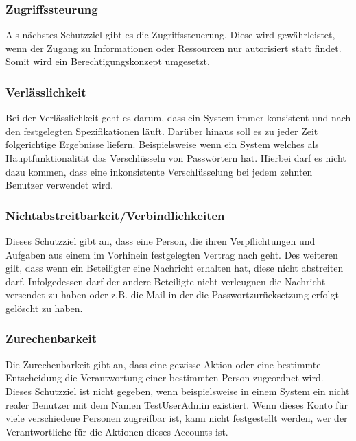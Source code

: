 \subsubsection{Zugriffssteurung}
Als nächstes Schutzziel gibt es die Zugriffssteuerung. Diese wird gewährleistet, wenn der Zugang zu Informationen oder Ressourcen nur autorisiert statt findet. Somit wird ein Berechtigungskonzept umgesetzt. 


\subsubsection{Verlässlichkeit}
Bei der Verlässlichkeit geht es darum, dass ein System immer konsistent und nach den festgelegten Spezifikationen läuft. Darüber hinaus soll es zu jeder Zeit folgerichtige Ergebnisse liefern. Beispielsweise wenn ein System welches als Hauptfunktionalität das Verschlüsseln von Passwörtern hat. Hierbei darf es nicht dazu kommen, dass eine inkonsistente Verschlüsselung bei jedem zehnten Benutzer verwendet wird.

\subsubsection{Nichtabstreitbarkeit/Verbindlichkeiten}
Dieses Schutzziel gibt an, dass eine Person, die ihren Verpflichtungen und Aufgaben aus einem im Vorhinein festgelegten Vertrag nach geht. Des weiteren gilt, dass wenn ein Beteiligter eine Nachricht erhalten hat, diese nicht abstreiten darf. Infolgedessen darf der andere Beteiligte nicht verleugnen die Nachricht versendet zu haben oder z.B. die Mail in der die Passwortzurücksetzung erfolgt gelöscht zu haben.


\subsubsection{Zurechenbarkeit}
Die Zurechenbarkeit gibt an, dass eine gewisse Aktion oder eine bestimmte Entscheidung die Verantwortung einer bestimmten Person zugeordnet wird. Dieses Schutzziel ist nicht gegeben, wenn beispielsweise in einem System ein nicht realer Benutzer mit dem Namen TestUserAdmin existiert. Wenn dieses Konto für viele verschiedene Personen zugreifbar ist, kann nicht festgestellt werden, wer der Verantwortliche für die Aktionen dieses Accounts ist.


